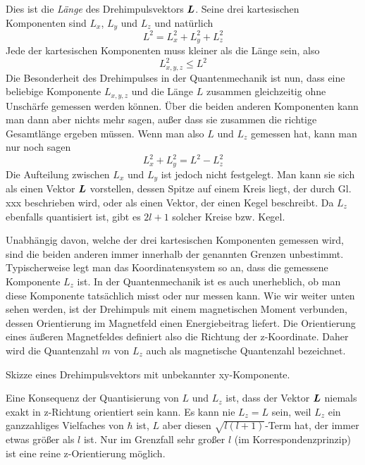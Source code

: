 Dies ist die \emph{Länge} des Drehimpulsvektors $\boldsymbol{L}$. Seine drei kartesischen Komponenten sind $L_x$, $L_y$ und $L_z$ und natürlich
\begin{equation}
    L^2 = L_x^2 + L_y^2+ L_z^2
\end{equation} 
Jede der kartesischen Komponenten muss kleiner als die Länge sein, also 
\begin{equation}
    L_{x,y,z}^2 \le L^2
\end{equation}
Die Besonderheit des Drehimpulses in der Quantenmechanik ist nun, dass eine beliebige Komponente $L_{x,y,z}$ und die Länge $L$ zusammen gleichzeitig ohne Unschärfe gemessen werden können. Über die beiden anderen Komponenten kann man dann aber nichts mehr sagen, außer dass sie zusammen die richtige Gesamtlänge ergeben müssen. Wenn man also $L$ und $L_z$ gemessen hat, kann man nur noch sagen
\begin{equation}
    L_x^2 + L_y^2 = L^2 - L_z^2
\end{equation}
Die Aufteilung zwischen $L_x$ und $L_y$ ist jedoch nicht festgelegt. Man kann sie sich als einen Vektor $\boldsymbol{L}$ vorstellen, dessen Spitze auf einem Kreis liegt, der durch Gl. xxx beschrieben wird, oder als einen Vektor, der einen Kegel beschreibt. Da $L_z$ ebenfalls quantisiert ist, gibt es $2l+1$ solcher Kreise bzw. Kegel.

Unabhängig davon, welche der drei kartesischen Komponenten gemessen wird, sind die beiden anderen immer innerhalb der genannten Grenzen unbestimmt. Typischerweise legt man das Koordinatensystem so an, dass die gemessene Komponente $L_z$ ist. In der Quantenmechanik ist es auch unerheblich, ob man diese Komponente tatsächlich misst oder nur messen kann. Wie wir weiter unten sehen werden, ist der Drehimpuls mit einem magnetischen Moment verbunden, dessen Orientierung im Magnetfeld einen Energiebeitrag liefert. Die Orientierung eines äußeren Magnetfeldes definiert also die Richtung der z-Koordinate. Daher wird die Quantenzahl $m$ von $L_z$ auch als magnetische Quantenzahl bezeichnet.


\begin{marginfigure}
    \caption{Skizze eines Drehimpulsvektors mit unbekannter xy-Komponente.}
\end{marginfigure}
    


Eine Konsequenz der Quantisierung von $L$ und $L_z$ ist, dass der Vektor $\boldsymbol{L}$ niemals exakt in z-Richtung orientiert sein kann. Es kann nie $L_z = L$ sein, weil $L_z$ ein ganzzahliges Vielfaches von $\hbar$ ist, $L$ aber diesen $\sqrt{l(l+1)}$-Term hat, der immer etwas größer als $l$ ist. Nur im Grenzfall sehr großer $l$ (im Korrespondenzprinzip) ist eine reine z-Orientierung möglich.

